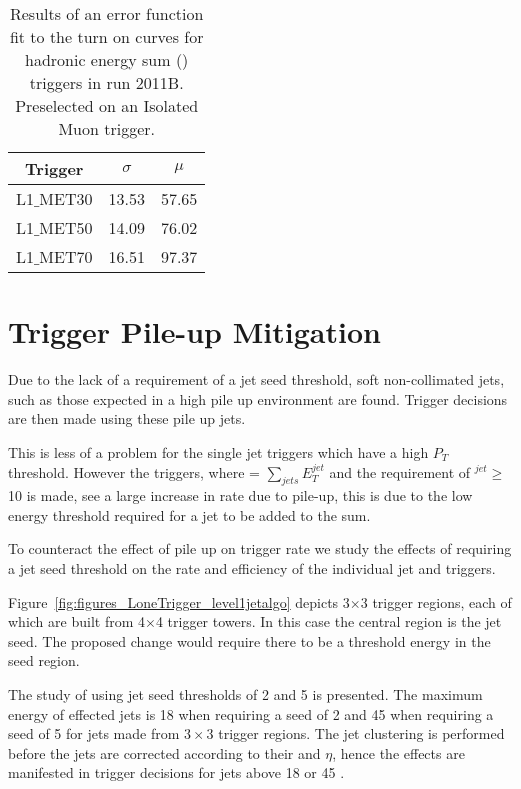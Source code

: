 \begin{table}[ht]
 \centering
\begin{tabular}{|c|c|c|}
\hline
\hline
Trigger & $\sigma$ & $\mu$\\
\hline
L1$\_$MET30 & 13.53 & 57.65 \\
\hline
L1$\_$MET50 & 14.09 & 76.02 \\
\hline
L1$\_$MET70 & 16.51 & 97.37 \\
\hline
\hline
\end{tabular}
\caption{Results of an error function fit to the turn on curves for \Lone 
hadronic energy sum (\MET) triggers in run 2011B. Preselected on an Isolated Muon trigger.}
\label{tab:2011B_MET_performance}
\end{table}

\clearpage
\section{\Lone Trigger Pile-up Mitigation} %
\label{sub:lone_trigger_pile_up_mitigation}
Due to the lack of a requirement of a jet seed threshold, soft non-collimated 
jets, such as those expected in a high pile up environment are found. Trigger 
decisions are then made using these pile up jets.

This is less of a problem for the single jet triggers which have a high $P_{T}$ 
threshold. However the \HT triggers, where \HT = $\sum_{jets}E_{T}^{jet}$ and 
the requirement of \ET$^{jet} \geq $10 \GeV is made, see a large increase in 
rate due to pile-up, this is due to the low energy  threshold required for a 
jet to be added to the \HT sum.

To counteract the effect of pile up on trigger rate we study the effects of 
requiring a jet seed threshold on the rate and efficiency of the individual jet 
and \HT triggers.

Figure~\ref{fig:figures_LoneTrigger_level1jetalgo} depicts 3$\times$3 trigger
regions, each of which are built from 4$\times$4 trigger towers. In this case 
the central region is the jet seed. The proposed change would require there to 
be a threshold energy in the seed region.

The study of using jet seed thresholds of 2 and 5 \GeV is presented. The 
maximum energy of effected jets is 18 \GeV when requiring a seed of 2 \GeV and 
45 \GeV when requiring a seed of 5 \GeV for jets made from $3\times3$ trigger 
regions. The jet clustering is performed before the \Lone jets are corrected 
according to their \ET and $\eta$, hence the effects are manifested in trigger 
decisions for \Lone jets above 18 or 45 \GeV.



